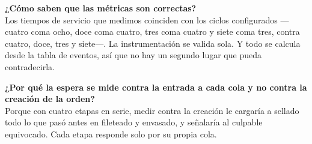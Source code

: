 \documentclass[11pt,a4paper]{article}
\begin{document}
\vspace{8pt}
\noindent\textbf{¿Cómo saben que las métricas son correctas?}\\
Los tiempos de servicio que medimos coinciden con los ciclos configurados
---cuatro coma ocho, doce coma cuatro, tres coma cuatro y siete coma tres,
contra cuatro, doce, tres y siete---. La instrumentación se valida sola. Y todo
se calcula desde la tabla de eventos, así que no hay un segundo lugar que pueda
contradecirla.

\vspace{8pt}
\noindent\textbf{¿Por qué la espera se mide contra la entrada a cada cola y no
contra la creación de la orden?}\\
Porque con cuatro etapas en serie, medir contra la creación le cargaría a
sellado todo lo que pasó antes en fileteado y envasado, y señalaría al culpable
equivocado. Cada etapa responde solo por su propia cola.
\end{document}
